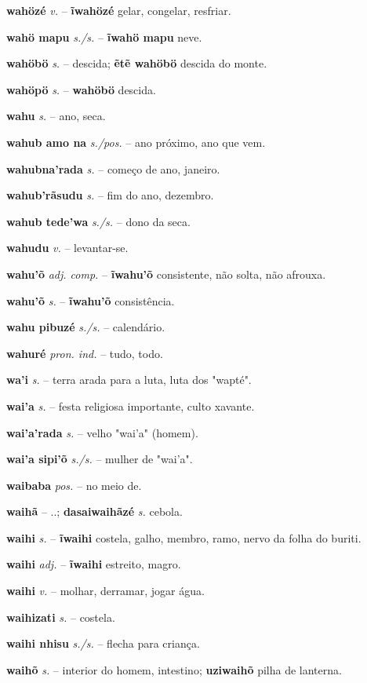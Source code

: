 \textbf{wahözé} \textit{v.} -- \textbf{ĩwahözé} gelar, congelar, resfriar.

\textbf{wahö mapu} \textit{s./s.} -- \textbf{ĩwahö mapu} neve.

\textbf{wahöbö} \textit{s.} -- descida; \textbf{ẽtẽ wahöbö} descida do monte.

\textbf{wahöpö} \textit{s.} -- \textbf{wahöbö} descida.

\textbf{wahu} \textit{s.} -- ano, seca.

\textbf{wahub amo na} \textit{s./pos.} -- ano próximo, ano que vem.

\textbf{wahubna'rada} \textit{s.} -- começo de ano, janeiro.

\textbf{wahub'rãsudu} \textit{s.} -- fim do ano, dezembro.

\textbf{wahub tede'wa} \textit{s./s.} -- dono da seca.

\textbf{wahudu} \textit{v.} -- levantar-se.

\textbf{wahu'õ} \textit{adj. comp.} -- \textbf{ĩwahu'õ} consistente, não solta, não afrouxa.

\textbf{wahu'õ} \textit{s.} -- \textbf{ĩwahu'õ} consistência.

\textbf{wahu pibuzé} \textit{s./s.} -- calendário.

\textbf{wahuré} \textit{pron. ind.} -- tudo, todo.

\textbf{wa'i} \textit{s.} -- terra arada para a luta, luta dos "wapté".

\textbf{wai'a} \textit{s.} -- festa religiosa importante, culto xavante.

\textbf{wai'a'rada} \textit{s.} -- velho "wai'a" (homem).

\textbf{wai'a sipi'õ} \textit{s./s.} -- mulher de "wai'a".

\textbf{waibaba} \textit{pos.} -- no meio de.

\textbf{waihã} \textit{} -- ..; \textbf{dasaiwaihãzé} \textit{s.} cebola.

\textbf{waihi} \textit{s.} -- \textbf{ĩwaihi} costela, galho, membro, ramo, nervo da folha do buriti.

\textbf{waihi} \textit{adj.} -- \textbf{ĩwaihi} estreito, magro.

\textbf{waihi} \textit{v.} -- molhar, derramar, jogar água.

\textbf{waihizati} \textit{s.} -- costela.

\textbf{waihi nhisu} \textit{s./s.} -- flecha para criança.

\textbf{waihõ} \textit{s.} -- interior do homem, intestino; \textbf{uziwaihõ} pilha de lanterna.

